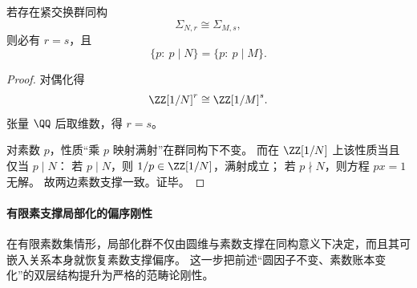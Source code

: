 \begin{proposition}\label{prop:cdim-solenoid-rigidity-rank-prime-support}
若存在紧交换群同构
\[
\Sigma_{N,r}\cong \Sigma_{M,s},
\]
则必有 \(r=s\)，且
\[
\{p:\ p\mid N\}=\{p:\ p\mid M\}.
\]
\end{proposition}

\begin{proof}
对偶化得
\[
\ZZ[1/N]^r\cong \ZZ[1/M]^s.
\]
张量 \(\QQ\) 后取维数，得 \(r=s\)。

对素数 \(p\)，性质“乘 \(p\) 映射满射”在群同构下不变。
而在 \(\ZZ[1/N]\) 上该性质当且仅当 \(p\mid N\)：
若 \(p\mid N\)，则 \(1/p\in\ZZ[1/N]\)，满射成立；
若 \(p\nmid N\)，则方程 \(px=1\) 无解。
故两边素数支撑一致。证毕。
\end{proof}





\paragraph{有限素支撑局部化的偏序刚性}
在有限素数集情形，局部化群不仅由圆维与素数支撑在同构意义下决定，而且其可嵌入关系本身就恢复素数支撑偏序。
这一步把前述“圆因子不变、素数账本变化”的双层结构提升为严格的范畴论刚性。

